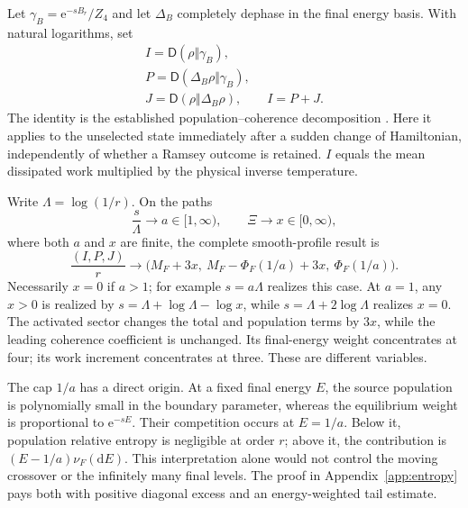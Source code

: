 \documentclass[aps,pra,reprint,superscriptaddress,longbibliography]{revtex4-2}
\newcommand{\dd}{\mathrm d}
\newcommand{\ee}{\mathrm e}
\newcommand{\Srel}{\mathsf D}
\begin{document}
Let $\gamma_B=\ee^{-sB_r}/Z_4$ and let $\Delta_B$ completely dephase in
the final energy basis. With natural logarithms, set
\begin{equation}
 \begin{gathered}
 I=\Srel(\rho\Vert\gamma_B),\quad\\
 P=\Srel(\Delta_B\rho\Vert\gamma_B),\quad\\
 J=\Srel(\rho\Vert\Delta_B\rho),\qquad I=P+J.                  \label{eq:allocation}
 \end{gathered}
\end{equation}
The identity is the established population--coherence decomposition
\cite{Francica2019}. Here it applies to the unselected state immediately
after a sudden change of Hamiltonian, independently of whether a Ramsey
outcome is retained. $I$ equals the mean dissipated work multiplied by
the physical inverse temperature.

Write $\Lambda=\log(1/r)$. On the paths
\begin{equation}
 \frac{s}{\Lambda}\to a\in[1,\infty),\qquad
 \Xi\to x\in[0,\infty),                                    \label{eq:thermopath}
\end{equation}
where both $a$ and $x$ are finite, the complete smooth-profile result is
\begin{equation}
 \frac{(I,P,J)}r\longrightarrow
 \bigl(M_F+3x,\ M_F-\Phi_F(1/a)+3x,\ \Phi_F(1/a)\bigr).
                                                               \label{eq:thermolaw}
\end{equation}
Necessarily $x=0$ if $a>1$; for example $s=a\Lambda$ realizes this
case. At $a=1$, any $x>0$ is realized by
$s=\Lambda+\log\Lambda-\log x$, while
$s=\Lambda+2\log\Lambda$ realizes $x=0$.
The activated sector changes the total and
population terms by $3x$, while the leading coherence coefficient is
unchanged. Its final-energy weight concentrates at four; its work
increment concentrates at three. These are different variables.

The cap $1/a$ has a direct origin. At a fixed final energy $E$, the
source population is polynomially small in the boundary parameter,
whereas the equilibrium weight is proportional to $\ee^{-sE}$.
Their competition occurs at $E=1/a$. Below it, population relative
entropy is negligible at order $r$; above it, the contribution is
$(E-1/a)\nu_F(\dd E)$. This interpretation alone would not control
the moving crossover or the infinitely many final levels. The proof
in Appendix~\ref{app:entropy} pays both with positive diagonal excess
and an energy-weighted tail estimate.
\end{document}
